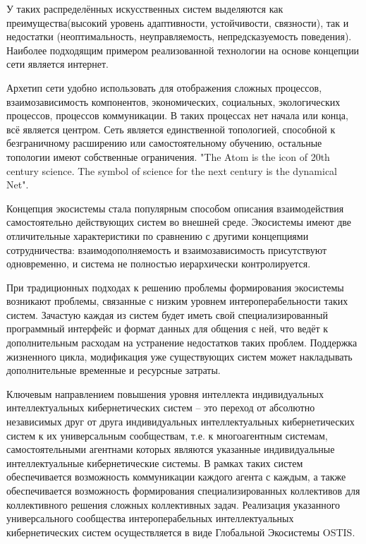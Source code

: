 У таких распределённых искусственных систем выделяются как преимущества(высокий уровень адаптивности, устойчивости, связности), так и недостатки (неоптимальность, неуправляемость, непредсказуемость поведения). Наиболее подходящим примером реализованной технологии на основе концепции сети является интернет.

Архетип сети удобно использовать для отображения сложных процессов, взаимозависимость компонентов, экономических, социальных, экологических процессов, процессов коммуникации. В таких процессах нет начала или конца, всё является центром. Сеть является единственной топологией, способной к безграничному расширению или самостоятельному обучению, остальные топологии имеют собственные ограничения. "The Atom is the icon of 20th century science. The symbol of science for the next century is the dynamical Net"{}.

Концепция экосистемы стала популярным способом описания взаимодействия самостоятельно действующих систем во внешней среде. 
Экосистемы имеют две отличительные характеристики по сравнению с другими концепциями сотрудничества: взаимодополняемость и взаимозависимость присутствуют одновременно, и система не полностью иерархически контролируется.

При традиционных подходах к решению проблемы формирования экосистемы возникают проблемы, связанные с низким уровнем интероперабельности таких систем.
Зачастую каждая из систем будет иметь свой специализированный программный интерфейс и формат данных для общения с ней, что ведёт к дополнительным расходам на устранение недостатков таких проблем. Поддержка жизненного цикла, модификация уже существующих систем может накладывать дополнительные временные и ресурсные затраты. 

Ключевым направлением повышения уровня интеллекта индивидуальных интеллектуальных кибернетических систем -- это переход от абсолютно независимых друг от друга индивидуальных интеллектуальных кибернетических систем к их универсальным сообществам, т.е. к многоагентным системам, самостоятельными агентнами которых являются указанные индивидуальные интеллектуальные кибернетические системы.
В рамках таких систем обеспечивается возможность коммуникации каждого агента с каждым, а также обеспечивается возможность формирования специализированных коллективов для коллективного решения сложных коллективных задач.
Реализация указанного универсального сообщества интероперабельных интеллектуальных кибернетических систем осуществляется в виде Глобальной Экосистемы OSTIS.

